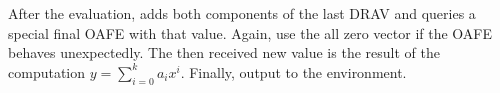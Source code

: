 \begin{JWprotocol}
\begin{JWprotoSteps}
  \item After the evaluation, \JWpTwo{} adds both components of the last DRAV
    and queries a special final OAFE with that value. Again, use the all zero
    vector if the OAFE behaves unexpectedly. The then received new value is the
    result of the computation $y = \sum_{i=0}^k a_ix^i$. Finally, output
     to the environment.

  \end{JWprotoSteps}

\end{JWprotocol}

\FloatBarrier

